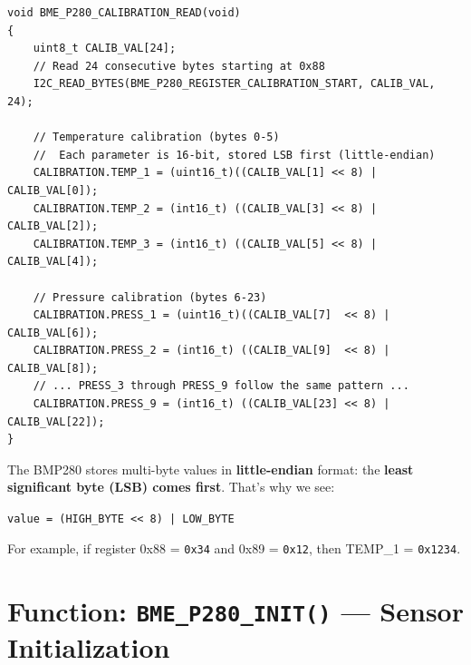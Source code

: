 \documentclass[12pt, a4paper]{article}
\begin{document}
\begin{codebox}
\begin{lstlisting}[style=CStyle]
void BME_P280_CALIBRATION_READ(void)
{
    uint8_t CALIB_VAL[24];
    // Read 24 consecutive bytes starting at 0x88
    I2C_READ_BYTES(BME_P280_REGISTER_CALIBRATION_START, CALIB_VAL, 24);

    // Temperature calibration (bytes 0-5)
    //  Each parameter is 16-bit, stored LSB first (little-endian)
    CALIBRATION.TEMP_1 = (uint16_t)((CALIB_VAL[1] << 8) | CALIB_VAL[0]);
    CALIBRATION.TEMP_2 = (int16_t) ((CALIB_VAL[3] << 8) | CALIB_VAL[2]);
    CALIBRATION.TEMP_3 = (int16_t) ((CALIB_VAL[5] << 8) | CALIB_VAL[4]);

    // Pressure calibration (bytes 6-23)
    CALIBRATION.PRESS_1 = (uint16_t)((CALIB_VAL[7]  << 8) | CALIB_VAL[6]);
    CALIBRATION.PRESS_2 = (int16_t) ((CALIB_VAL[9]  << 8) | CALIB_VAL[8]);
    // ... PRESS_3 through PRESS_9 follow the same pattern ...
    CALIBRATION.PRESS_9 = (int16_t) ((CALIB_VAL[23] << 8) | CALIB_VAL[22]);
}
\end{lstlisting}
\end{codebox}

\begin{tipbox}
The BMP280 stores multi-byte values in \textbf{little-endian} format: the \textbf{least significant byte (LSB) comes first}. That's why we see:
\begin{center}
\texttt{value = (HIGH\_BYTE << 8) | LOW\_BYTE}
\end{center}
For example, if register 0x88 = \texttt{0x34} and 0x89 = \texttt{0x12}, then TEMP\_1 = \texttt{0x1234}.
\end{tipbox}

\section{Function: \texttt{BME\_P280\_INIT()} --- Sensor Initialization}
\end{document}
